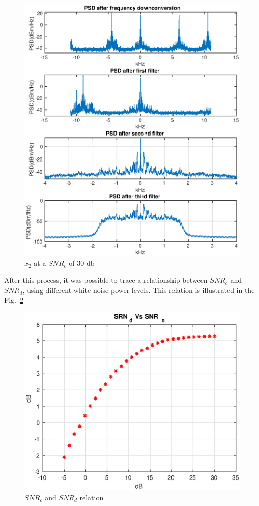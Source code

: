 \documentclass[
	12pt,				%
	openright,			%
	oneside,			%
	a4paper,			%
	chapter=TITLE,		%
	english,			%
	french,				%
	spanish,			%
	brazil				%
	]{abntex2}
\theoremstyle{definition}
\begin{document}
\begin{figure}[h!]
	\centering
	\includegraphics{imagens/x2hat.eps}
	\caption{$\hat{x}_2$ at a $SNR_c$ of 30 db}
	\label{fig:hat_x2}
\end{figure}

After this process, it was possible to trace a relationship between $SNR_c$ and $SNR_d$, using different white noise power levels. This relation is illustrated in the Fig.~\ref{fig:snr}

\begin{figure}[h!]
	\centering
	\includegraphics{imagens/SNR.eps}
	\caption{$SNR_c$ and $SNR_d$ relation}
	\label{fig:snr}
\end{figure}

\end{document}
